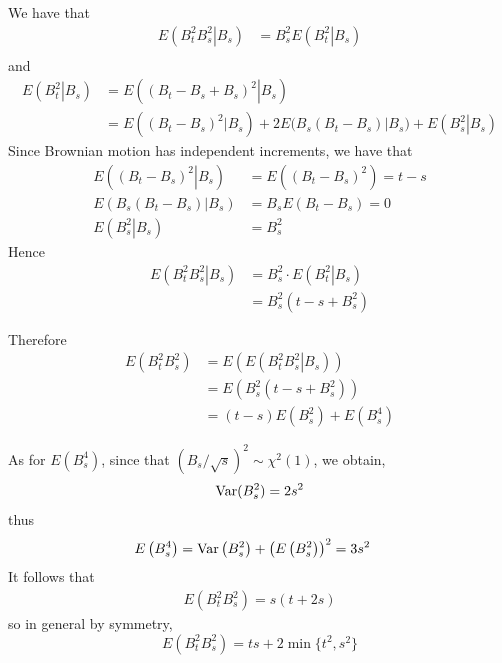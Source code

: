     We have that
    \begin{align*}
        E\left.\left(B_t^2B_s^2\right|B_s\right)
        &=B_s^2E\left.\left(B_t^2\right|B_s\right)\\
    \end{align*}
    and
    \begin{align*}
        E\left.\left(B_t^2\right|B_s\right)
        &=E\left.\left((B_t-B_s+B_s)^2\right|B_s\right)\\
        &=E\left((B_t-B_s)^2|B_s\right)
            +2E\big(B_s(B_t-B_s)|B_s\big)
            +E\left.\left(B_s^2\right|B_s\right)
    \end{align*}
    Since Brownian motion has independent increments, we have
    that
    \begin{align*}
    E\left.\left((B_t-B_s)^2\right|B_s\right)
    &=E\left((B_t-B_s)^2\right)=t-s\\
    E\left.\left(B_s(B_t-B_s)\right|B_s\right)&=B_sE(B_t-B_s)=0\\
    E\left.\left(B_s^2\right|B_s\right)&=B_s^2
    \end{align*}
    Hence
    \begin{align*}
        E\left.\left(B_t^2B_s^2\right|B_s\right)
        &=B_s^2\cdot E\left.\left(B_t^2\right|B_s\right)\\
        &=B_s^2\left(t-s+B_s^2\right)
    \end{align*} 

    Therefore
    \begin{align*}
    E\left(B_t^2B_s^2\right)&=E\left(E\left.\left(B_t^2B_s^2\right|B_s\right)\right)\\
    &=E\left(B_s^2\left(t-s+B_s^2\right)\right)\\
    &=(t-s)E\left(B_s^2\right)+E\left(B_s^4\right)
    \end{align*}


    As for $E\left(B_s^4\right)$, since that $\left(B_s/\sqrt{s}\right)^2
    \sim\chi^2(1)$, we obtain,
    \[\mathrm{Var}(B_s^2)=2s^2\]
    thus
    \begin{align*}
        E\left(B_s^4\right)&=\mathrm{Var}\left(B_s^2\right)+\left(E\left(B_s^2\right)\right)^2=3s^2
    \end{align*}
    It follows that
    \begin{align*}
    E\left(B_t^2B_s^2\right)=s(t+2s)
    \end{align*}
    so in general by symmetry,
    \begin{equation}
        \label{eq:EBs2Bt2}
        E\left(B_t^2B_s^2\right)=ts+2\min\{t^2,s^2\}
    \end{equation}

